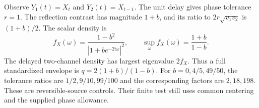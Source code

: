 Observe $Y_1(t)=X_t$ and $Y_2(t)=X_{t-1}$. The unit delay gives phase tolerance $r=1$. The reflection contrast has magnitude $1+b$, and its ratio to $2r\sqrt{v_1v_2}$ is $(1+b)/2$. The scalar density is
\[
 f_X(\omega)=\frac{1-b^2}{|1+be^{-2i\omega}|^2},
 \qquad \sup_\omega f_X(\omega)=\frac{1+b}{1-b}.
\]
The delayed two-channel density has largest eigenvalue $2f_X$. Thus a full standardized envelope is $q=2(1+b)/(1-b)$. For $b=0,4/5,49/50$, the tolerance ratios are $1/2,9/10,99/100$ and the corresponding factors are $2,18,198$. These are reversible-source controls. Their finite test still uses common centering and the supplied phase allowance.
